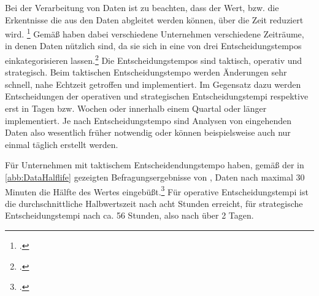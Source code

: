 
Bei der Verarbeitung von Daten ist zu beachten, dass der Wert, bzw. die Erkentnisse die aus den Daten abgleitet werden können, über die Zeit reduziert wird. \footcite[Vgl. auch im Folgenden][]{NucleusResarchInc..2012} Gemäß \citeauthor{NucleusResarchInc..2012} haben dabei verschiedene Unternehmen verschiedene Zeiträume, in denen Daten nützlich sind, da sie sich in eine von drei Entscheidungstempos einkategorisieren lassen.\footcite[Vgl. auch im Folgenden][3]{NucleusResarchInc..2012} Die Entscheidungstempos sind taktisch, operativ und strategisch. Beim taktischen Entscheidungstempo werden Änderungen sehr schnell, nahe Echtzeit getroffen und implementiert. Im Gegensatz dazu werden Entscheidungen der operativen und strategischen Entscheidungstempi respektive erst in Tagen bzw. Wochen oder innerhalb einem Quartal oder länger implementiert. Je nach Entscheidungstempo sind Analysen von eingehenden Daten also wesentlich früher notwendig oder können beispielsweise auch nur einmal täglich erstellt werden.




Für Unternehmen mit taktischem Entscheidendungstempo haben, gemäß der in \autoref{abb:DataHalflife} gezeigten Befragungsergebnisse von \citeauthor{NucleusResarchInc..2012}, Daten nach maximal 30 Minuten die Hälfte des Wertes eingebüßt.\footcite[Vgl. auch im Folgenden][6]{NucleusResarchInc..2012} Für operative Entscheidungstempi ist die durchschnittliche Halbwertszeit nach acht Stunden erreicht, für strategische Entscheidungstempi nach ca. 56 Stunden, also nach über 2 Tagen.



